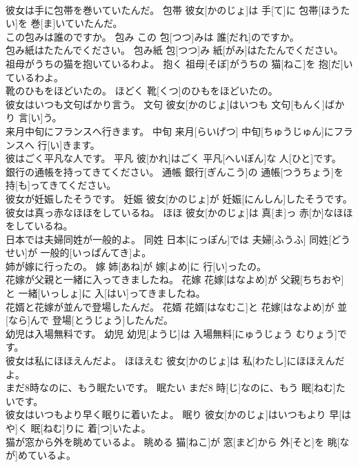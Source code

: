\documentclass[8pt]{extreport}
\begin{document}
\begin{CJK}{UTF8}{min}
\\	彼女は手に包帯を巻いていたんだ。	包帯	彼女[かのじょ]は 手[て]に 包帯[ほうたい]を 巻[ま]いていたんだ。	
\\	この包みは誰のですか。	包み	この 包[つつ]みは 誰[だれ]のですか。	
\\	包み紙はたたんでください。	包み紙	包[つつ]み 紙[がみ]はたたんでください。	
\\	祖母がうちの猫を抱いているわよ。	抱く	祖母[そぼ]がうちの 猫[ねこ]を 抱[だ]いているわよ。	
\\	靴のひもをほどいたの。	ほどく	靴[くつ]のひもをほどいたの。	
\\	彼女はいつも文句ばかり言う。	文句	彼女[かのじょ]はいつも 文句[もんく]ばかり 言[い]う。	
\\	来月中旬にフランスへ行きます。	中旬	来月[らいげつ] 中旬[ちゅうじゅん]にフランスへ 行[い]きます。	
\\	彼はごく平凡な人です。	平凡	彼[かれ]はごく 平凡[へいぼん]な 人[ひと]です。	
\\	銀行の通帳を持ってきてください。	通帳	銀行[ぎんこう]の 通帳[つうちょう]を 持[も]ってきてください。	
\\	彼女が妊娠したそうです。	妊娠	彼女[かのじょ]が 妊娠[にんしん]したそうです。	
\\	彼女は真っ赤なほほをしているね。	ほほ	彼女[かのじょ]は 真[ま]っ 赤[か]なほほをしているね。	
\\	日本では夫婦同姓が一般的よ。	同姓	日本[にっぽん]では 夫婦[ふうふ] 同姓[どうせい]が 一般的[いっぱんてき]よ。	
\\	姉が嫁に行ったの。	嫁	姉[あね]が 嫁[よめ]に 行[い]ったの。	
\\	花嫁が父親と一緒に入ってきましたね。	花嫁	花嫁[はなよめ]が 父親[ちちおや]と 一緒[いっしょ]に 入[はい]ってきましたね。	
\\	花婿と花嫁が並んで登場したんだ。	花婿	花婿[はなむこ]と 花嫁[はなよめ]が 並[なら]んで 登場[とうじょう]したんだ。	
\\	幼児は入場無料です。	幼児	幼児[ようじ]は 入場無料[にゅうじょう むりょう]です。	
\\	彼女は私にほほえんだよ。	ほほえむ	彼女[かのじょ]は 私[わたし]にほほえんだよ。	
\\	まだ8時なのに、もう眠たいです。	眠たい	まだ8 時[じ]なのに、もう 眠[ねむ]たいです。	
\\	彼女はいつもより早く眠りに着いたよ。	眠り	彼女[かのじょ]はいつもより 早[はや]く 眠[ねむ]りに 着[つ]いたよ。	
\\	猫が窓から外を眺めているよ。	眺める	猫[ねこ]が 窓[まど]から 外[そと]を 眺[なが]めているよ。	

\end{CJK}
\end{document}
